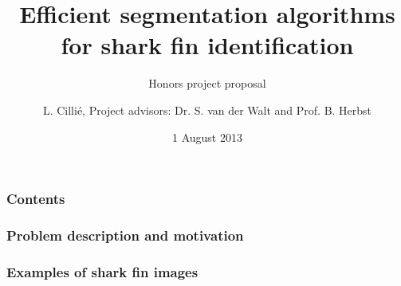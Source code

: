 \documentclass{beamer}
\title{Efficient segmentation algorithms for shark fin identification}
\subtitle{Honors project proposal}
\author{L. Cilli\'{e}, Project advisors: Dr. S. van der Walt and Prof. B. Herbst}
\date{1 August 2013}
\institute{Department of Applied Mathematics, Stellenbosch University}
\begin{document}
\maketitle
\tableofcontents[ 
currentsubsection, 
hideothersubsections, 
sectionstyle=show/hide, 
subsectionstyle=show/shaded]

\begin{frame}
\frametitle{Contents}

\end{frame}

\begin{frame}
\frametitle{Problem description and motivation}
\end{frame}

\begin{frame}
\frametitle{Examples of shark fin images}


\end{frame}
\end{document}
